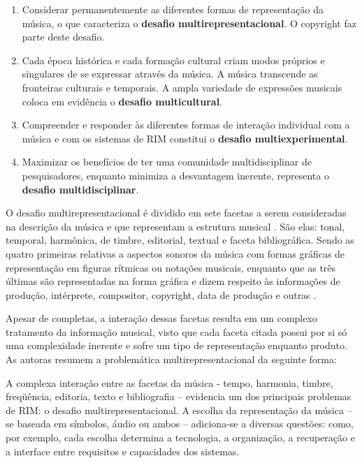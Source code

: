 \begin{citacao}
    \begin{enumerate}
        \item Considerar permanentemente as diferentes formas de representação da música, o que caracteriza o \textbf{desafio multirepresentacional}. O copyright faz parte deste desafio.
        \item Cada época histórica e cada formação cultural criam modos próprios e singulares de se expressar através da música. A música transcende as fronteiras culturais e temporais. A ampla variedade de expressões musicais coloca em evidência o \textbf{desafio multicultural}.
        \item Compreender e responder às diferentes formas de interação individual com a música e com os sistemas de RIM constitui o \textbf{desafio multiexperimental}.
        \item Maximizar os benefícios de ter uma comunidade multidisciplinar de pesquisadores, enquanto minimiza a desvantagem inerente, representa o \textbf{desafio multidisciplinar}.
    \end{enumerate}
\end{citacao}

O desafio multirepresentacional é dividido em sete facetas a serem consideradas na descrição da música e que representam a estrutura musical \cite{downie2003}. São elas: tonal, temporal, harmônica, de timbre, editorial, textual e faceta bibliográfica. Sendo as quatro primeiras relativas a aspectos sonoros da música com formas gráficas de representação em figuras rítmicas ou notações musicais, enquanto que as três últimas são representadas na forma gráfica e dizem respeito às informações de produção, intérprete, compositor, copyright, data de produção e outras \cite{barros2012}.

Apesar de completas, a interação dessas facetas resulta em um complexo tratamento da informação musical, visto que cada faceta citada possui por si só uma complexidade inerente e sofre um tipo de representação enquanto produto. As autoras  resumem a problemática multirepresentacional da seguinte forma:

\begin{citacao}
    A complexa interação entre as facetas da música - tempo, harmonia, timbre, freqüência, editoria, texto e bibliografia – evidencia um dos principais problemas de RIM: o desafio multirepresentacional. A escolha da representação da música – se baseada em símbolos, áudio ou ambos – adiciona-se a diversas questões: como, por exemplo, cada escolha determina a tecnologia, a organização, a recuperação e a interface entre requisitos e capacidades dos sistemas.
\end{citacao}

